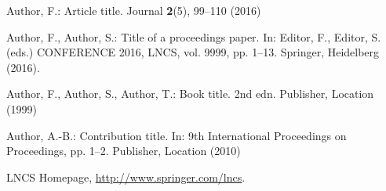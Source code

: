 \documentclass[runningheads]{llncs}
\begin{document}

%
\begin{thebibliography}{8}
Author, F.: Article title. Journal \textbf{2}(5), 99--110 (2016)

Author, F., Author, S.: Title of a proceedings paper. In: Editor,
F., Editor, S. (eds.) CONFERENCE 2016, LNCS, vol. 9999, pp. 1--13.
Springer, Heidelberg (2016). 

Author, F., Author, S., Author, T.: Book title. 2nd edn. Publisher,
Location (1999)

Author, A.-B.: Contribution title. In: 9th International Proceedings
on Proceedings, pp. 1--2. Publisher, Location (2010)

LNCS Homepage, \url{http://www.springer.com/lncs}.
\end{thebibliography}
\end{document}
